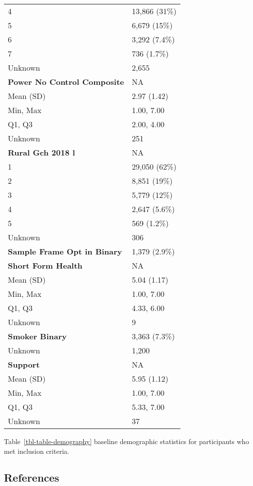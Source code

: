 \documentclass[
  single column]{article}
\begin{document}
\begin{longtable}[]{@{}ll@{}}
4 & 13,866 (31\%) \\
5 & 6,679 (15\%) \\
6 & 3,292 (7.4\%) \\
7 & 736 (1.7\%) \\
Unknown & 2,655 \\
\textbf{Power No Control Composite} & NA \\
Mean (SD) & 2.97 (1.42) \\
Min, Max & 1.00, 7.00 \\
Q1, Q3 & 2.00, 4.00 \\
Unknown & 251 \\
\textbf{Rural Gch 2018 l} & NA \\
1 & 29,050 (62\%) \\
2 & 8,851 (19\%) \\
3 & 5,779 (12\%) \\
4 & 2,647 (5.6\%) \\
5 & 569 (1.2\%) \\
Unknown & 306 \\
\textbf{Sample Frame Opt in Binary} & 1,379 (2.9\%) \\
\textbf{Short Form Health} & NA \\
Mean (SD) & 5.04 (1.17) \\
Min, Max & 1.00, 7.00 \\
Q1, Q3 & 4.33, 6.00 \\
Unknown & 9 \\
\textbf{Smoker Binary} & 3,363 (7.3\%) \\
Unknown & 1,200 \\
\textbf{Support} & NA \\
Mean (SD) & 5.95 (1.12) \\
Min, Max & 1.00, 7.00 \\
Q1, Q3 & 5.33, 7.00 \\
Unknown & 37 \\
\end{longtable}

Table~\ref{tbl-table-demography} baseline demographic statistics for
participants who met inclusion criteria.

\newpage{}

\subsection*{References}\label{references}
\end{document}
